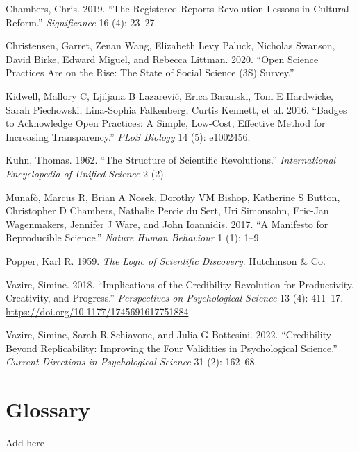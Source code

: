 \documentclass[
  letterpaper,
]{book}
\newlength{\cslhangindent}
\newenvironment{CSLReferences}[2] %
 {\begin{list}{}{%
  \setlength{\itemindent}{0pt}
  \setlength{\leftmargin}{0pt}
  \setlength{\parsep}{0pt}
  \ifodd #1
   \setlength{\leftmargin}{\cslhangindent}
   \setlength{\itemindent}{-1\cslhangindent}
  \fi
  \setlength{\itemsep}{#2\baselineskip}}}
 {\end{list}}
\begin{document}

\label{refs}
\begin{CSLReferences}{1}{0}
Chambers, Chris. 2019. {``The Registered Reports Revolution Lessons in
Cultural Reform.''} \emph{Significance} 16 (4): 23--27.

Christensen, Garret, Zenan Wang, Elizabeth Levy Paluck, Nicholas
Swanson, David Birke, Edward Miguel, and Rebecca Littman. 2020. {``Open
Science Practices Are on the Rise: The State of Social Science (3S)
Survey.''}

Kidwell, Mallory C, Ljiljana B Lazarević, Erica Baranski, Tom E
Hardwicke, Sarah Piechowski, Lina-Sophia Falkenberg, Curtis Kennett, et
al. 2016. {``Badges to Acknowledge Open Practices: A Simple, Low-Cost,
Effective Method for Increasing Transparency.''} \emph{PLoS Biology} 14
(5): e1002456.

Kuhn, Thomas. 1962. {``The Structure of Scientific Revolutions.''}
\emph{International Encyclopedia of Unified Science} 2 (2).

Munafò, Marcus R, Brian A Nosek, Dorothy VM Bishop, Katherine S Button,
Christopher D Chambers, Nathalie Percie du Sert, Uri Simonsohn, Eric-Jan
Wagenmakers, Jennifer J Ware, and John Ioannidis. 2017. {``A Manifesto
for Reproducible Science.''} \emph{Nature Human Behaviour} 1 (1): 1--9.

Popper, Karl R. 1959. \emph{The Logic of Scientific Discovery}.
Hutchinson \& Co.

Vazire, Simine. 2018. {``Implications of the Credibility Revolution for
Productivity, Creativity, and Progress.''} \emph{Perspectives on
Psychological Science} 13 (4): 411--17.
\url{https://doi.org/10.1177/1745691617751884}.

Vazire, Simine, Sarah R Schiavone, and Julia G Bottesini. 2022.
{``Credibility Beyond Replicability: Improving the Four Validities in
Psychological Science.''} \emph{Current Directions in Psychological
Science} 31 (2): 162--68.

\end{CSLReferences}


\chapter*{\texorpdfstring{{Glossary}}{Glossary}}\label{glossary}


Add here


\backmatter
\end{document}

